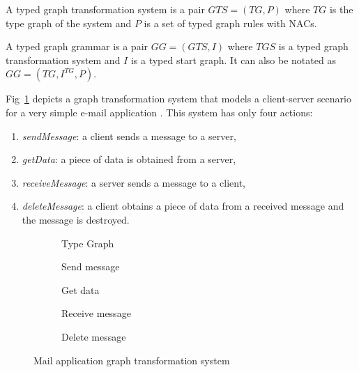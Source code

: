 \begin{definition} A typed graph transformation system is a pair $GTS = \left(TG,P\right)$ where $TG$ is the type graph of the system and $P$ is a set of typed graph rules with NACs.

  A typed graph grammar is a pair $GG = \left(GTS,I\right)$ where $TGS$ is a typed graph transformation system and $I$ is a typed start graph. It can also be notated as $GG = \left(TG, I^{TG},P \right)$.

\end{definition}

\begin{example} Fig~\ref{fig:gts:mail} depicts a graph transformation system that models a client-server scenario for a very simple e-mail application . This system has only four actions: 

\begin{enumerate}
  \item \emph{sendMessage}: a client sends a message to a server,
  \item \emph{getData}: a piece of data is obtained from a server,
  \item \emph{receiveMessage}: a server sends a message to a client,
  \item \emph{deleteMessage}: a client obtains a piece of data from a received message and the message is destroyed.
\end{enumerate}

\begin{figure}[!ht]
  \centering
  \begin{subfigure}[t]{.5\textwidth}
    \centerline{}
    \caption{Type Graph}
  \end{subfigure}
  \begin{subfigure}[t]{.5\textwidth}
    \centerline{}
    \caption{Send message}
  \end{subfigure}%
  \begin{subfigure}[t]{.5\textwidth}
    \centerline{}
    \caption{Get data}
  \end{subfigure}
  \begin{subfigure}[t]{.5\textwidth}
    \centerline{}
    \caption{Receive message}
  \end{subfigure}%
  \begin{subfigure}[t]{.5\textwidth}
    \centerline{}
    \caption{Delete message}
  \end{subfigure}
  \caption{Mail application graph transformation system}\label{fig:gts:mail}
\end{figure}


\end{example}
